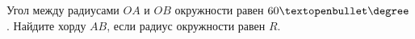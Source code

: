\begin{ex}
	\begin{condition}
		Угол между радиусами \( OA  \) и \( OB  \) окружности равен \( 60◦\degree\). Найдите хорду \( AB \), если радиус окружности равен \( R \).
	\end{condition}
\end{ex}